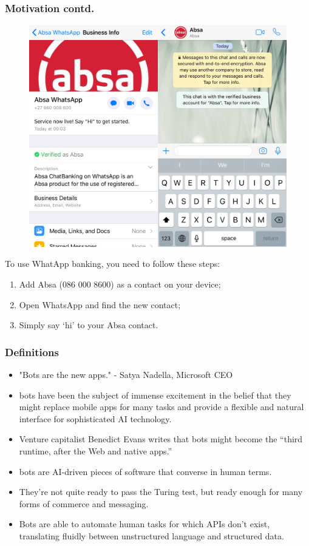 \documentclass[11pt]{beamer}
\begin{document}
\begin{frame}
\frametitle{Motivation contd.}
\begin{figure}[h]
	\centering
	\includegraphics[scale=.1]{images/Absa-Whatsapp}
	\label{Absa-Whatsapp}
\end{figure}
To use WhatApp banking, you need to follow these steps:
\begin{enumerate}
	\item Add Absa (086 000 8600) as a contact on your device;
	\item Open WhatsApp and find the new contact;
	\item Simply say ‘hi’ to your Absa contact.
\end{enumerate}
\end{frame}

\begin{frame}
\frametitle{Definitions}
\begin{itemize}
	\item "Bots are the new apps." - Satya Nadella, Microsoft CEO
	\item bots have been the subject of immense excitement in the belief that they might replace mobile apps for many tasks and provide a flexible and natural interface for sophisticated AI technology.
	\item Venture capitalist Benedict Evans writes that bots might become the “third runtime, after the Web and native apps.”
	\item bots are AI-driven pieces of software that converse in human terms.
	\item They’re not quite ready to pass the Turing test, but ready enough for many forms of commerce and messaging.
	\item Bots are able to automate human tasks for which APIs don’t exist, translating fluidly between unstructured language and structured data.
\end{itemize}
\end{frame}
\end{document}
